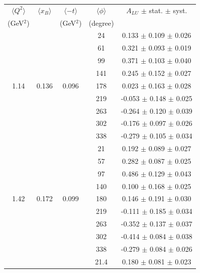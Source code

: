 \documentclass[aps,prc,preprint,superscriptaddress]{revtex4}
\begin{document}
\begin{table}[!h]
   \begin{center}
      \begin{tabular}{|c|c|c|c|c|}
         \hline
 $\langle Q^{2} \rangle$ & $\langle x_{B} \rangle$ & $\langle -t \rangle$ & $\langle \phi \rangle$ & $A_{LU}$ $\pm$ stat. $\pm$ syst.\\
 (GeV$^{2}$) &           & (GeV$^{2}$) & (degree) &  \\
         \hline
        &       &       & 24    &  0.133  $\pm$ 0.109  $\pm$ 0.026  \\ 
        &       &       & 61    &  0.321  $\pm$ 0.093  $\pm$ 0.019  \\ 
        &       &       & 99    &  0.371  $\pm$ 0.103  $\pm$ 0.040  \\ 
        &       &       & 141   &  0.245  $\pm$ 0.152  $\pm$ 0.027  \\ 
  1.14  & 0.136 & 0.096 & 178   &  0.023  $\pm$ 0.163  $\pm$ 0.028  \\ 
        &       &       & 219   & -0.053  $\pm$ 0.148  $\pm$ 0.025  \\ 
        &       &       & 263   & -0.264  $\pm$ 0.120  $\pm$ 0.039  \\ 
        &       &       & 302   & -0.176  $\pm$ 0.097  $\pm$ 0.026  \\ 
        &       &       & 338   & -0.279  $\pm$ 0.105  $\pm$ 0.034  \\ 
  \hline 
        &       &       &  21   &  0.192  $\pm$ 0.089  $\pm$ 0.027  \\ 
        &       &       &  57   &  0.282  $\pm$ 0.087  $\pm$ 0.025  \\ 
        &       &       &  97   &  0.486  $\pm$ 0.129  $\pm$ 0.043  \\ 
        &       &       & 140   &  0.100  $\pm$ 0.168  $\pm$ 0.025  \\ 
  1.42  & 0.172 & 0.099 & 180   &  0.146  $\pm$ 0.191  $\pm$ 0.030  \\ 
        &       &       & 219   & -0.111  $\pm$ 0.185  $\pm$ 0.034  \\ 
        &       &       & 263   & -0.352  $\pm$ 0.137  $\pm$ 0.037  \\ 
        &       &       & 302   & -0.414  $\pm$ 0.084  $\pm$ 0.038  \\ 
        &       &       & 338   & -0.279  $\pm$ 0.084  $\pm$ 0.026  \\ 
  \hline 
        &       &       &  21.4 &  0.180  $\pm$ 0.081  $\pm$ 0.023  \\ 

\end{tabular}
\end{center}
\end{table}
\end{document}
